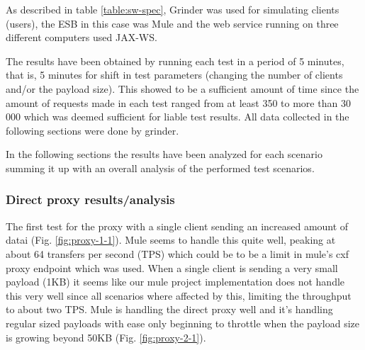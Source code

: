 As described in table \ref{table:sw-spec}, Grinder was used for simulating clients (users), the ESB in this case was Mule and the web service running on three different computers used JAX-WS.

The results have been obtained by running each test in a period of 5 minutes, that is, 5 minutes for shift in test parameters (changing the number of clients and/or the payload size). 
This showed to be a sufficient amount of time since the amount of requests made in each test ranged from at least 350 to more than 30 000 which was deemed sufficient for liable test results. All data collected in the following sections were done by grinder.

In the following sections the results have been analyzed for each scenario summing it up with an overall analysis of the performed test scenarios.

\subsubsection{Direct proxy results/analysis}
\label{test:results}
The first test for the proxy with a single client sending an increased amount of datai (Fig. \ref{fig:proxy-1-1}). Mule seems to handle this quite well, peaking at about 64 transfers per second (TPS) which could be to be a limit in mule's cxf proxy endpoint which was used. When a single client is sending a very small payload (1KB) it seems like our mule project implementation does not handle this very well since all scenarios where affected by this, limiting the throughput to about two TPS. Mule is handling the direct proxy well and it's handling regular sized payloads with ease only beginning to throttle when the payload size is growing beyond 50KB (Fig. \ref{fig:proxy-2-1}).

